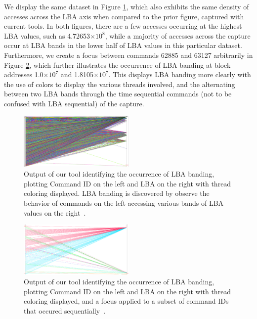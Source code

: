 \documentclass[journal]{vgtc}                %
\providecommand{\e}[1]{\ensuremath{\times 10^{#1}}}
\begin{document}
We display the same dataset in Figure \ref{fig:lba_banding_full}, which also exhibits the same density of accesses across the LBA axis when compared to the prior figure, captured with current tools. In both figures, there are a few accesses occurring at the highest LBA values, such as 4.72653\e{8}, while a majority of accesses across the capture occur at LBA bands in the lower half of LBA values in this particular dataset. Furthermore, we create a focus between commands 62885 and 63127 arbitrarily in Figure \ref{fig:lba_banding}, which further illustrates the occurrence of LBA banding at block addresses 1.0\e{7} and 1.8105\e{7}. This displays LBA banding more clearly with the use of colors to display the various threads involved, and the alternating between two LBA bands through the time sequential commands (not to be confused with LBA sequential) of the capture.

\begin{figure}[h!!]
 \centering
 \includegraphics[width=0.5\textwidth]{images/lba_banding_full.eps}
 \caption[Output of our tool identifying the occurrence of LBA banding.]{Output of our tool identifying the occurrence of LBA banding, plotting Command ID on the left and LBA on the right with thread coloring displayed. LBA banding is discovered by observe the behavior of commands on the left accessing various bands of LBA values on the right~\cite{internal:collab}.}
 \label{fig:lba_banding_full}
\end{figure}

\begin{figure}[h!!]
 \centering
 \includegraphics[width=0.5\textwidth]{images/11.eps}
 \caption[Output of our tool identifying the occurrence of LBA banding.]{Output of our tool identifying the occurrence of LBA banding, plotting Command ID on the left and LBA on the right with thread coloring displayed, and a focus applied to a subset of command IDs that occured sequentially~\cite{internal:collab}.}
 \label{fig:lba_banding}
\end{figure}
\end{document}
